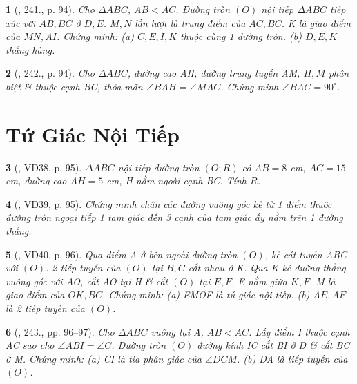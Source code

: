 \documentclass{article}
\newtheorem{baitoan}{}
\begin{document}
\begin{baitoan}[\cite{Binh_Toan_9_tap_2}, 241., p. 94]
	Cho $\Delta ABC$, $AB < AC$. Đường tròn $(O)$ nội tiếp $\Delta ABC$ tiếp xúc với $AB,BC$ ở $D,E$. $M,N$ lần lượt là trung điểm của $AC,BC$. K là giao điểm của $MN,AI$. Chứng minh: (a) $C,E,I,K$ thuộc cùng 1 đường tròn. (b) $D,E,K$ thẳng hàng.
\end{baitoan}

\begin{baitoan}[\cite{Binh_Toan_9_tap_2}, 242., p. 94]
	Cho $\Delta ABC$, đường cao AH, đường trung tuyến AM, $H,M$ phân biệt \& thuộc cạnh BC, thỏa mãn $\angle{BAH} = \angle{MAC}$. Chứng minh $\angle{BAC} = 90^\circ$.
\end{baitoan}


\section{Tứ Giác Nội Tiếp}

\begin{baitoan}[\cite{Binh_Toan_9_tap_2}, VD38, p. 95]
	$\Delta ABC$ nội tiếp đường tròn $(O;R)$ có $AB = 8$ {\rm cm}, $AC = 15$ {\rm cm}, đường cao $AH = 5$ {\rm cm}, H nằm ngoài cạnh BC. Tính $R$.
\end{baitoan}

\begin{baitoan}[\cite{Binh_Toan_9_tap_2}, VD39, p. 95]
	Chứng minh chân các đường vuông góc kẻ từ 1 điểm thuộc đường tròn ngoại tiếp 1 tam giác đến 3 cạnh của tam giác ấy nằm trên 1 đường thẳng.
\end{baitoan}

\begin{baitoan}[\cite{Binh_Toan_9_tap_2}, VD40, p. 96]
	Qua điểm A ở bên ngoài đường tròn $(O)$, kẻ cát tuyến ABC với $(O)$. 2 tiếp tuyến của $(O)$ tại $B,C$ cắt nhau ở K. Qua K kẻ đường thẳng vuông góc với AO, cắt AO tại H \& cắt $(O)$ tại $E,F$, E nằm giữa $K,F$. M là giao điểm của $OK,BC$. Chứng minh: (a) EMOF là tứ giác nội tiếp. (b) $AE,AF$ là 2 tiếp tuyến của $(O)$.
\end{baitoan}

\begin{baitoan}[\cite{Binh_Toan_9_tap_2}, 243., pp. 96--97]
	Cho $\Delta ABC$ vuông tại A, $AB < AC$. Lấy điểm I thuộc cạnh AC sao cho $\angle{ABI} = \angle{C}$. Đường tròn $(O)$ đường kính IC cắt BI ở D \& cắt BC ở M. Chứng minh: (a) CI là tia phân giác của $\angle{DCM}$. (b) DA là tiếp tuyến của $(O)$.
\end{baitoan}
\end{document}
